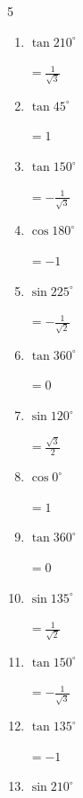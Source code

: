 \begin{multicols}{5}
\begin{enumerate}
        $\displaystyle =-\sqrt{3}$

  \item $\displaystyle \tan{210^\circ}$

        $\displaystyle =\frac{1}{\sqrt{3}}$

  \item $\displaystyle \tan{45^\circ}$

        $\displaystyle =1$

  \item $\displaystyle \tan{150^\circ}$

        $\displaystyle =-\frac{1}{\sqrt{3}}$

  \item $\displaystyle \cos{180^\circ}$

        $\displaystyle =-1$

  \item $\displaystyle \sin{225^\circ}$

        $\displaystyle =-\frac{1}{\sqrt{2}}$

  \item $\displaystyle \tan{360^\circ}$

        $\displaystyle =0$

  \item $\displaystyle \sin{120^\circ}$

        $\displaystyle =\frac{\sqrt{3}}{2}$

  \item $\displaystyle \cos{0^\circ}$

        $\displaystyle =1$

\columnbreak %

  \item $\displaystyle \tan{360^\circ}$

        $\displaystyle =0$

  \item $\displaystyle \sin{135^\circ}$

        $\displaystyle =\frac{1}{\sqrt{2}}$

  \item $\displaystyle \tan{150^\circ}$

        $\displaystyle =-\frac{1}{\sqrt{3}}$

  \item $\displaystyle \tan{135^\circ}$

        $\displaystyle =-1$

  \item $\displaystyle \sin{210^\circ}$


\end{enumerate}
\end{multicols}
